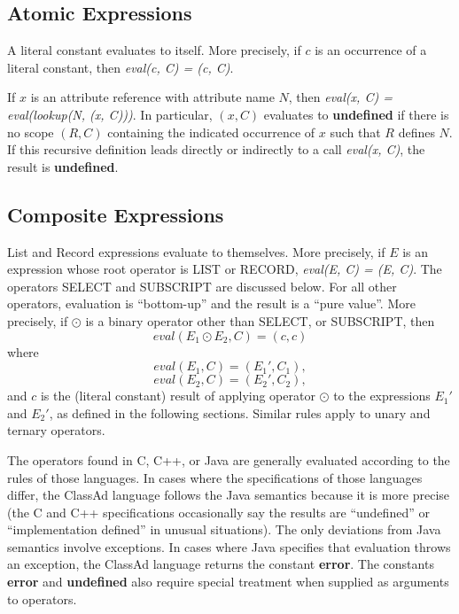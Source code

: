 \documentclass{article}
\begin{document}
\subsection{Atomic Expressions}

A literal constant evaluates to itself.
More precisely, if $c$ is an occurrence of a literal constant, then
\emph{eval(c, C) = (c, C)}.

If $x$ is an attribute reference with attribute name $N$, then
\emph{eval(x, C) = eval(lookup(N, (x, C)))}.
In particular, $(x, C)$ evaluates to \textbf{undefined} if there is no scope
$(R, C)$ containing the indicated occurrence of $x$ such that $R$ defines $N$.
If this recursive definition leads directly or indirectly to a call
\emph{eval(x, C)}, the result is \textbf{undefined}.

\subsection{Composite Expressions}

List and Record expressions evaluate to themselves.
More precisely, if $E$ is an expression whose root operator is LIST or
RECORD, \emph{eval(E, C) = (E, C)}.
The operators SELECT and SUBSCRIPT are discussed below.
For all other operators, evaluation is ``bottom-up'' and the result is
a ``pure value''.
More precisely, if $\odot$ is a binary operator other than
SELECT, or SUBSCRIPT, then
\[ eval(E_1 \odot E_2, C) = (c, c) \]
where
\[ eval(E_1, C)  = (E_1', C_1), \]
\[ eval(E_2, C)  = (E_2', C_2), \]
and $c$ is the (literal constant) result of applying operator $\odot$ to the
expressions $E_1'$ and $E_2'$, as defined in the following sections.
Similar rules apply to unary and ternary operators.

The operators found in C, C++, or Java are generally evaluated according to the
rules of those languages.
In cases where the specifications of those languages differ, the ClassAd
language follows the Java semantics because it is more precise (the C and C++
specifications occasionally say the results are ``undefined'' or
``implementation defined'' in unusual situations).
The only deviations from Java semantics involve exceptions.
In cases where Java specifies that evaluation throws an exception, the ClassAd
language returns the constant \textbf{error}.  The constants \textbf{error} and
\textbf{undefined} also require special treatment when supplied as arguments to
operators.
\end{document}
